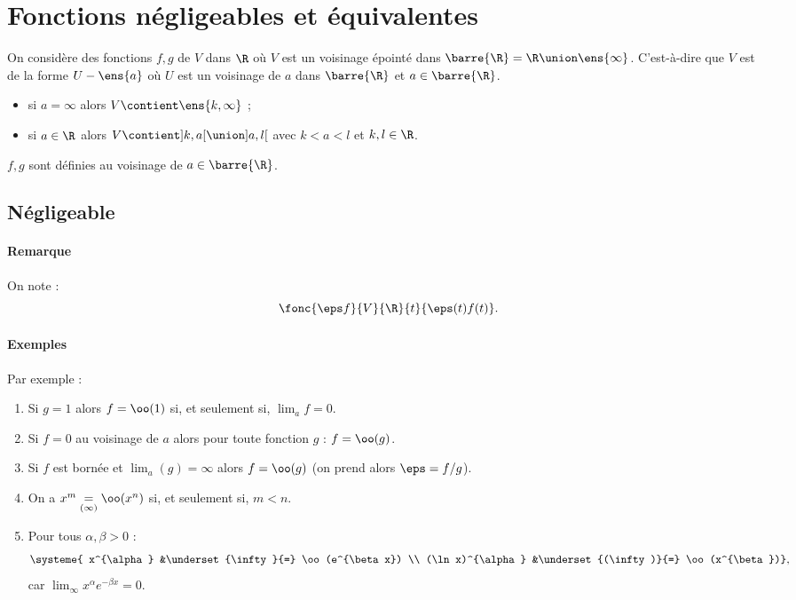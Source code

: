\documentclass{mybourbaki}
\newcommand{\iR}{\barre{\R}}
\begin{document}
\tableofcontents
\section{Fonctions négligeables et équivalentes}

On considère des fonctions $f,g$ de $V$ dans $\R$ où $V$ est un voisinage épointé dans $\barre{\R} = \R \union \ens{\infty}$. C'est-à-dire que $V$ est de la forme $U - \ens{a}$ où $U$ est un voisinage de $a$ dans $\barre{\R}$ et $a\in \iR$.
\begin{itemize}
\item si $a = \infty$ alors $V \contient \ens{k,\infty}$ ;
\item si $a\in \R$ alors $V \contient ]k,a[ \union ]a,l[$ avec $k < a < l$ et $k,l\in \R$.
\end{itemize}

$f,g$ sont définies au voisinage de $a\in \iR$.

\subsection{Négligeable}

\paragraph{Remarque}On note :\[\fonc{\eps f}{V}{\R}{t}{\eps(t)f(t)}. \]
\paragraph{Exemples}Par exemple :
\begin{enumerate}
\item Si $g=1$ alors $f = \oo(1)$ si, et seulement si, $\lim_a f =0$.
\item Si $f=0$ au voisinage de $a$ alors pour toute fonction $g$ : $f = \oo(g)$.
\item Si $f$ est bornée et $\lim_a(g) = \infty$ alors $f = \oo(g)$ (on prend alors $\eps = f/g$).
\item On a $x^m \underset{(\infty)}{=}\oo(x^n)$ si, et seulement si, $m < n$.
\item Pour tous $\alpha,\beta >0$ : \[\systeme{ x^{\alpha} &\underset{\infty}{=} \oo(e^{\beta x}) \\ (\ln x)^{\alpha} &\underset{(\infty)}{=} \oo(x^{\beta})},\]car $\lim_\infty x^{\alpha}e^{-\beta x} = 0$.
\end{enumerate}
\end{document}
